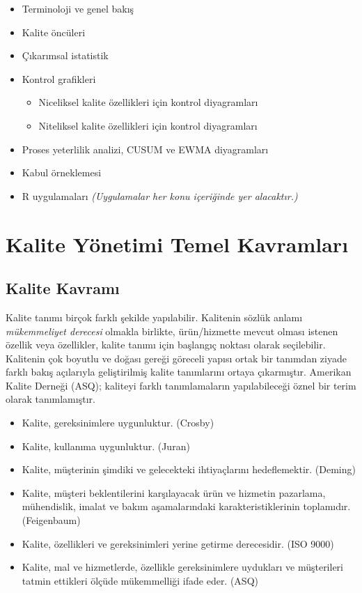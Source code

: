 \documentclass[
]{book}
\providecommand{\tightlist}{%
  \setlength{\itemsep}{0pt}\setlength{\parskip}{0pt}}
\begin{document}
\begin{itemize}
\item
  Terminoloji ve genel bakış
\item
  Kalite öncüleri
\item
  Çıkarımsal istatistik
\item
  Kontrol grafikleri

  \begin{itemize}
  \tightlist
  \item
    Niceliksel kalite özellikleri için kontrol diyagramları
  \item
    Niteliksel kalite özellikleri için kontrol diyagramları
  \end{itemize}
\item
  Proses yeterlilik analizi, CUSUM ve EWMA diyagramları
\item
  Kabul örneklemesi
\item
  R uygulamaları \emph{(Uygulamalar her konu içeriğinde yer alacaktır.)}
\end{itemize}

\hypertarget{kalite-yuxf6netimi-temel-kavramlarux131}{%
\chapter{Kalite Yönetimi Temel Kavramları}\label{kalite-yuxf6netimi-temel-kavramlarux131}}

\hypertarget{kalite-kavramux131}{%
\section{Kalite Kavramı}\label{kalite-kavramux131}}

Kalite tanımı birçok farklı şekilde yapılabilir. Kalitenin sözlük anlamı \emph{mükemmeliyet derecesi} olmakla birlikte, ürün/hizmette mevcut olması istenen özellik veya özellikler, kalite tanımı için başlangıç noktası olarak seçilebilir. Kalitenin çok boyutlu ve doğası gereği göreceli yapısı ortak bir tanımdan ziyade farklı bakış açılarıyla geliştirilmiş kalite tanımlarını ortaya çıkarmıştır. Amerikan Kalite Derneği (ASQ); kaliteyi farklı tanımlamaların yapılabileceği öznel bir terim olarak tanımlamıştır.

\begin{itemize}
\tightlist
\item
  Kalite, gereksinimlere uygunluktur. (Crosby)
\item
  Kalite, kullanıma uygunluktur. (Juran)
\item
  Kalite, müşterinin şimdiki ve gelecekteki ihtiyaçlarını hedeflemektir. (Deming)
\item
  Kalite, müşteri beklentilerini karşılayacak ürün ve hizmetin pazarlama, mühendislik, imalat ve bakım aşamalarındaki karakteristiklerinin toplamıdır. (Feigenbaum)
\item
  Kalite, özellikleri ve gereksinimleri yerine getirme derecesidir. (ISO 9000)
\item
  Kalite, mal ve hizmetlerde, özellikle gereksinimlere uydukları ve müşterileri tatmin ettikleri ölçüde mükemmelliği ifade eder. (ASQ)
\end{itemize}
\end{document}
